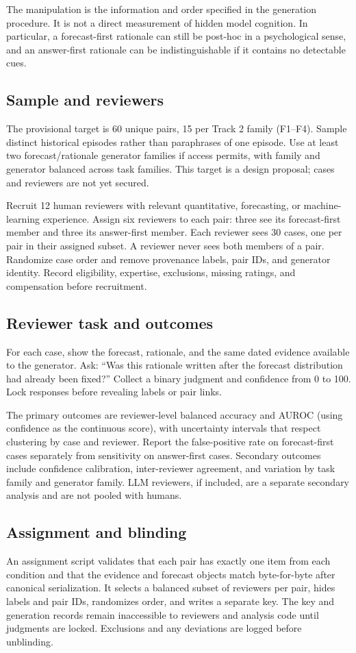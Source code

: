 \documentclass[10pt]{article}
\begin{document}
The manipulation is the information and order specified in the generation procedure. It is not a direct measurement of hidden model cognition. In particular, a forecast-first rationale can still be post-hoc in a psychological sense, and an answer-first rationale can be indistinguishable if it contains no detectable cues.

\subsection{Sample and reviewers}
The provisional target is 60 unique pairs, 15 per Track 2 family (F1--F4). Sample distinct historical episodes rather than paraphrases of one episode. Use at least two forecast/rationale generator families if access permits, with family and generator balanced across task families. This target is a design proposal; cases and reviewers are not yet secured.

Recruit 12 human reviewers with relevant quantitative, forecasting, or machine-learning experience. Assign six reviewers to each pair: three see its forecast-first member and three its answer-first member. Each reviewer sees 30 cases, one per pair in their assigned subset. A reviewer never sees both members of a pair. Randomize case order and remove provenance labels, pair IDs, and generator identity. Record eligibility, expertise, exclusions, missing ratings, and compensation before recruitment.

\subsection{Reviewer task and outcomes}
For each case, show the forecast, rationale, and the same dated evidence available to the generator. Ask: “Was this rationale written after the forecast distribution had already been fixed?” Collect a binary judgment and confidence from 0 to 100. Lock responses before revealing labels or pair links.

The primary outcomes are reviewer-level balanced accuracy and AUROC (using confidence as the continuous score), with uncertainty intervals that respect clustering by case and reviewer. Report the false-positive rate on forecast-first cases separately from sensitivity on answer-first cases. Secondary outcomes include confidence calibration, inter-reviewer agreement, and variation by task family and generator family. LLM reviewers, if included, are a separate secondary analysis and are not pooled with humans.

\subsection{Assignment and blinding}
An assignment script validates that each pair has exactly one item from each condition and that the evidence and forecast objects match byte-for-byte after canonical serialization. It selects a balanced subset of reviewers per pair, hides labels and pair IDs, randomizes order, and writes a separate key. The key and generation records remain inaccessible to reviewers and analysis code until judgments are locked. Exclusions and any deviations are logged before unblinding.
\end{document}
